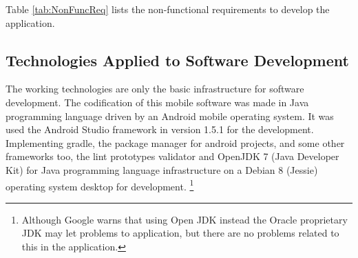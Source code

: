 	\begin{table}[h!]
		Table \ref{tab:NonFuncReq} lists the non-functional requirements to develop the application. 
		
		\begin{center}
			\end{center}
			\label{tab:NonFuncReq}
			\caption{Table for all non-functional requirements}
		\end{table}


\subsection{Technologies Applied to Software Development}
		
The working technologies are only the basic infrastructure for software development. The codification of this mobile software was made in Java programming language driven by an Android mobile operating system. It was used the Android Studio framework in version 1.5.1 for the development. Implementing gradle, the package manager for android projects, and some other frameworks too, the lint prototypes validator and OpenJDK 7 (Java Developer Kit) for Java programming language infrastructure on a Debian 8 (Jessie) operating system desktop for development. \footnote{Although Google warns that using Open JDK instead the Oracle proprietary JDK may let problems to application, but there are no problems related to this in the application.} 
		
